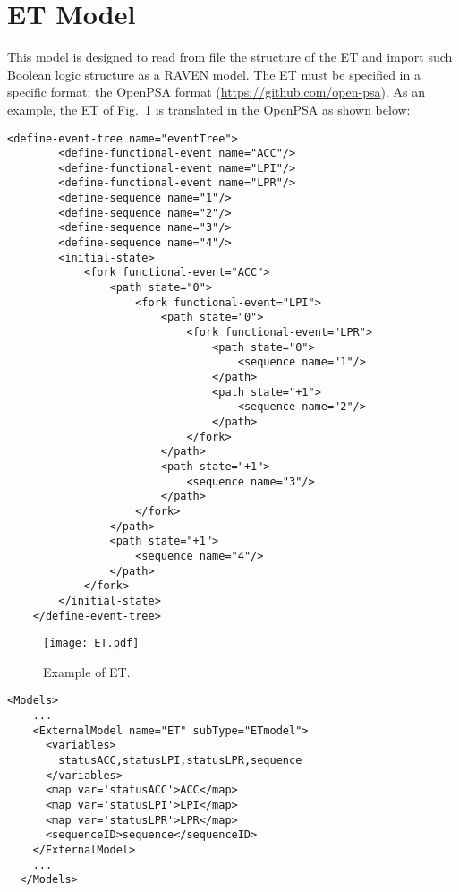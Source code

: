 \section{ET Model}
\label{sec:ETmodel}

This model is designed to read from file the structure of the ET and import such Boolean logic structure as a RAVEN model.
The ET must be specified in a specific format: the OpenPSA format (\href{<url>}{https://github.com/open-psa}). 
As an example, the ET of Fig.~\ref{fig:ET} is translated in the OpenPSA as shown below:

\begin{lstlisting}[style=XML,morekeywords={anAttribute},caption=ETmodel input example., label=lst:ETmodel]
	<define-event-tree name="eventTree">
	    <define-functional-event name="ACC"/>
	    <define-functional-event name="LPI"/>
	    <define-functional-event name="LPR"/>
	    <define-sequence name="1"/>
	    <define-sequence name="2"/>
	    <define-sequence name="3"/>
	    <define-sequence name="4"/>
	    <initial-state>
	        <fork functional-event="ACC">
	            <path state="0">
	                <fork functional-event="LPI">
	                    <path state="0">
	                        <fork functional-event="LPR">
	                            <path state="0">
	                                <sequence name="1"/>
	                            </path>
	                            <path state="+1">
	                                <sequence name="2"/>
	                            </path>
	                        </fork>
	                    </path>
	                    <path state="+1">
	                        <sequence name="3"/>
	                    </path>
	                </fork>
	            </path>
	            <path state="+1">
	                <sequence name="4"/>
	            </path>
	        </fork>
	    </initial-state>
	</define-event-tree>
\end{lstlisting} 

\begin{figure}
    \centering
    \centerline{\texttt{[image: ET.pdf]}} 
    \caption{Example of ET.}
    \label{fig:ET}
\end{figure}

\begin{lstlisting}[style=XML,morekeywords={anAttribute},caption=ET model input example., label=lst:ET_InputExample]
  <Models> 
    ...
    <ExternalModel name="ET" subType="ETmodel">
      <variables>
        statusACC,statusLPI,statusLPR,sequence
      </variables>
      <map var='statusACC'>ACC</map>
      <map var='statusLPI'>LPI</map>
      <map var='statusLPR'>LPR</map>
      <sequenceID>sequence</sequenceID>
    </ExternalModel>
    ...
  </Models>
\end{lstlisting}

